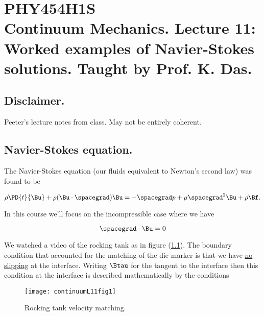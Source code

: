 
%

\chapter{PHY454H1S\\Continuum Mechanics.  Lecture 11: Worked examples of Navier-Stokes solutions.  Taught by Prof. K. Das.}
\label{chap:continuumL11}
{}
\date{Feb 15, 2012}

\beginArtWithToc

\section{Disclaimer.}

Peeter's lecture notes from class.  May not be entirely coherent.


\section{Navier-Stokes equation.}

The Navier-Stokes equation (our fluids equivalent to Newton's second law) was found to be

\begin{equation}\label{eqn:continuumL11:10}
\rho \PD{t}{\Bu} + \rho (\Bu \cdot \spacegrad) \Bu = - \spacegrad p + \mu \spacegrad^2 \Bu + \rho \Bf.
\end{equation}

In this course we'll focus on the incompressible case where we have

\begin{equation}\label{eqn:continuumL11:30}
\spacegrad \cdot \Bu = 0
\end{equation}

We watched a video of the rocking tank as in figure (\ref{fig:continuumL11:continuumL11fig1}).  The boundary condition that accounted for the matching of the die marker is that we have \underline{no slipping} at the interface.  Writing $\Btau$ for the tangent to the interface then this condition at the interface is described mathematically by the conditions

\begin{figure}[htp]
   \centering
   \texttt{[image: continuumL11fig1]}
   \caption{Rocking tank velocity matching.}\label{fig:continuumL11:continuumL11fig1}
\end{figure}

